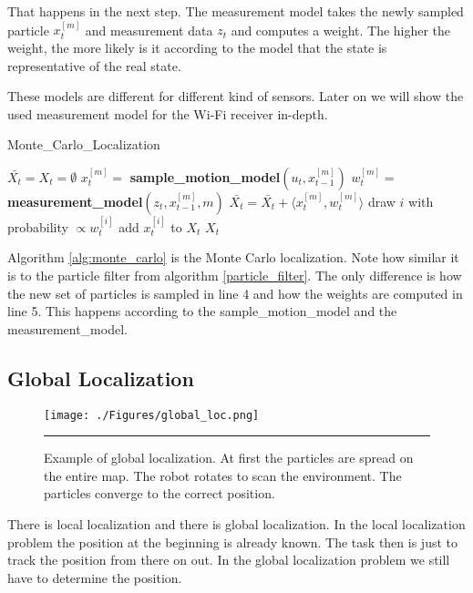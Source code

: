 That happens in the next step. The measurement model takes the newly sampled particle $x_t^{[m]}$ and measurement data $z_t$ and computes a weight. The higher the weight, the more likely is it according to the model that the state is representative of the real state. 

These models are different for different kind of sensors. Later on we will show the used measurement model for the Wi-Fi receiver in-depth. 

\begin{algorithm}
\caption{Monte\_Carlo\_Localization \cite[p. 252]{Thrun:2005:PR:1121596}}
\label{alg:monte_carlo}
\begin{algorithmic}[1]
\State $\bar{X_t} = X_t = \emptyset$
\State $x_t^{[m]} = $ \textbf{sample\_motion\_model}$(u_t,x_{t-1}^{[m]})$
\State $w_t^{[m]} = $ \textbf{measurement\_model}$(z_t,x_{t-1}^{[m]},m)$
\State $\bar{X_t} = \bar{X_t} + \langle x_t^{[m]},w_t^{[m]}\rangle$
\EndFor
{}
\State draw $i$ with probability $\propto w_t^{[i]}$
\State add $x_t^{[i]}$ to $X_t$
\EndFor
\State \Return $X_t$
\EndProcedure
\end{algorithmic}
\end{algorithm}

Algorithm \ref{alg:monte_carlo} is the Monte Carlo localization. Note how similar it is to the particle filter from algorithm \ref{particle_filter}. The only difference is how the new set of particles is sampled in line 4 and how the weights are computed in line 5. This happens according to the sample\_motion\_model and the measurement\_model. 
\subsection{Global Localization}
\begin{figure}[htbp]
	\centering
		\texttt{[image: ./Figures/global\_loc.png]}
		\rule{35em}{0.5pt}
	\caption[Example of the global localization]{Example of global localization. At first the particles are spread on the entire map. The robot rotates to scan the environment. The particles converge to the correct position.}
	\label{fig:global_localization}
\end{figure}
There is local localization and there is global localization. In the local localization problem the position at the beginning is already known. The task then is just to track the position from there on out. In the global localization problem we still have to determine the position. 

